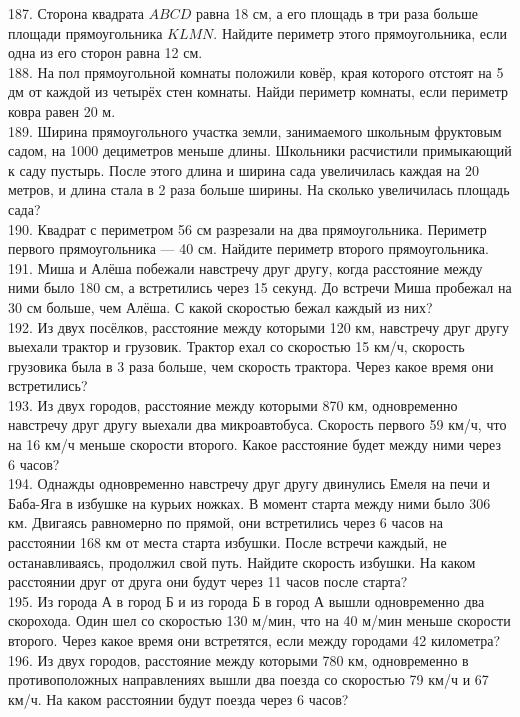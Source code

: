 187. Сторона квадрата $ABCD$ равна 18 см, а его площадь в три раза больше площади прямоугольника $KLMN.$ Найдите периметр этого прямоугольника, если одна из его сторон равна 12 см.\\
188. На пол прямоугольной комнаты положили ковёр, края которого отстоят на  5 дм от каждой из четырёх стен комнаты. Найди периметр комнаты, если периметр ковра равен 20 м.\\
189.  Ширина прямоугольного участка земли, занимаемого школьным фруктовым садом, на 1000 дециметров меньше длины. Школьники расчистили примыкающий к саду пустырь. После этого длина и ширина сада увеличилась каждая на 20 метров, и длина стала в 2 раза больше ширины. На сколько увеличилась площадь сада?\\
190.  Квадрат с периметром 56 см разрезали на два прямоугольника. Периметр первого прямоугольника --- 40 см. Найдите периметр второго прямоугольника.\\
191. Миша и Алёша побежали  навстречу друг другу, когда расстояние между ними было 180 см, а встретились через 15 секунд. До встречи Миша пробежал на 30 см больше, чем Алёша. С какой скоростью бежал каждый из них?\\
192. Из двух посёлков, расстояние между которыми 120 км, навстречу друг другу выехали трактор и грузовик. Трактор ехал со скоростью 15 км/ч, скорость грузовика была в 3 раза больше, чем скорость трактора. Через какое время они встретились?\\
193. Из двух городов, расстояние между которыми  870 км, одновременно навстречу друг другу выехали два микроавтобуса. Скорость первого 59 км/ч, что на 16 км/ч меньше скорости второго. Какое расстояние будет между ними через 6 часов?\\
194. Однажды одновременно навстречу друг другу двинулись Емеля на печи и Баба-Яга в избушке на курьих ножках. В момент старта между ними было 306 км. Двигаясь равномерно по прямой, они встретились через 6 часов на расстоянии 168 км от места старта избушки. После встречи каждый, не останавливаясь, продолжил свой путь. Найдите скорость избушки. На каком расстоянии друг от друга они будут через 11 часов после старта?\\
195. Из города А в город Б и из города Б в город А вышли одновременно два скорохода. Один шел со скоростью 130 м/мин, что на 40 м/мин меньше скорости второго. Через какое время они встретятся, если между городами 42 километра?\\
196. Из двух городов, расстояние между которыми 780 км, одновременно в противоположных направлениях вышли два поезда со скоростью 79 км/ч и 67 км/ч. На каком расстоянии будут поезда через 6 часов?\\
